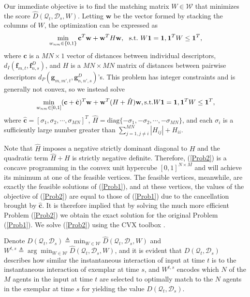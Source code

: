 Our immediate objective is to find the matching matrix $W\in\mathcal{W}$ that minimizes the score $\hat{D}(\mathcal{Q}_{t}, \mathcal{D}_{s}, W)$. Letting $\mathbf{w}$ be the vector formed by stacking the columns of $W$, the optimization can be expressed as
\begin{equation}
\label{Prob1}
\min_{w_{nm}\in\{0,1\}}\mathbf{c}^{T}\mathbf{w}+\mathbf{w}^{T}H\mathbf{w},\ \ \textup{s.t.}\ W\mathbf{1}=\mathbf{1}, \mathbf{1}^{T}W\leq\mathbf{1}^{T},
\end{equation}
where $\mathbf{c}$ is a $MN\times 1$ vector of distances between individual descriptors, $d_{I}(\mathbf{f}_{m,t}, \mathbf{f}^{D}_{n,s})$, and $H$ is a $MN\times MN$ matrix of distances between pairwise descriptors $d_{P}(\mathbf{g}_{m,m',t}, \mathbf{g}^{D}_{n,n',s})$'s. This problem has integer constraints and is generally not convex, so we instead solve
\begin{equation}
\label{Prob2}
\min_{w_{nm}\in[0,1]}(\mathbf{c}+\hat{\mathbf{c}})^{T}\mathbf{w}+\mathbf{w}^{T}(H+\hat{H})\mathbf{w}, \textup{s.t.} W\mathbf{1}=\mathbf{1}, \mathbf{1}^{T}W\leq\mathbf{1}^{T},
\end{equation}
where $\hat{\mathbf{c}}=[\sigma_{1},\sigma_{2},\cdots,\sigma_{MN}]^{T}$, $\hat{H}=\text{diag}\{-\sigma_{1},-\sigma_{2},\cdots,-\sigma_{MN}\}$, and each $\sigma_{i}$ is a sufficiently large number greater than $\sum^{MN}_{j=1,j\neq i}|H_{ij}|+H_{ii}$. 

Note that $\hat{H}$ imposes a negative strictly dominant diagonal to $H$ and the quadratic term $\hat{H}+H$ is strictly negative definite. Therefore, (\ref{Prob2}) is a concave programming in the convex unit hypercube $[0,1]^{N\times M}$ and will achieve its minimum at one of the feasible vertices. The feasible vertices, meanwhile, are exactly the feasible solutions of (\ref{Prob1}), and at these vertices, the values of the objective of (\ref{Prob2}) are equal to those of (\ref{Prob1}) due to the cancellation brought by $\hat{\mathbf{c}}$. It is therefore implied that by solving the much more efficient Problem (\ref{Prob2}) we obtain the exact solution for the original Problem (\ref{Prob1}). We solve (\ref{Prob2}) using the CVX toolbox \cite{cvx}.

Denote $D(\mathcal{Q}_{t}, \mathcal{D}_{s})\triangleq\min_{W\in\mathcal{W}}\hat{D}(\mathcal{Q}_{t}, \mathcal{D}_{s}, W)$ and $W^{t,s}\triangleq\arg\min_{W\in\mathcal{W}}\hat{D}(\mathcal{Q}_{t}, \mathcal{D}_{s}, W)$, and it is evident that $D(\mathcal{Q}_{t}, \mathcal{D}_{s})$ describes how similar the instantaneous interaction of input at time $t$ is to the instantaneous interaction of exemplar at time $s$, and $W^{t,s}$ encodes which $N$ of the $M$ agents in the input at time $t$ are selected to optimally match to the $N$ agents in the exemplar at time $s$ for yielding the value $D(\mathcal{Q}_{t}, \mathcal{D}_{s})$.

